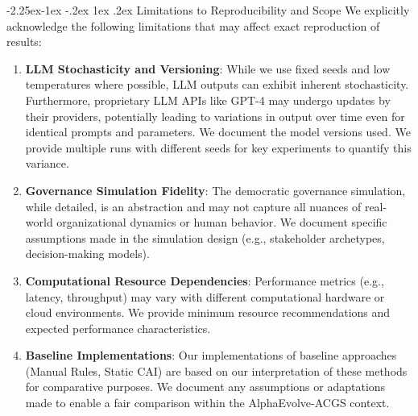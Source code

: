 \documentclass[manuscript,screen,review,anonymous,9pt]{acmart}
\makeatletter
\renewcommand\subsection{\@startsection{subsection}{2}{\z@}%
  {-2.25ex\@plus -1ex \@minus -.2ex}%
  {1ex \@plus .2ex}%
  {\normalfont\large\bfseries}}
\makeatother
\begin{document}
\subsection{Limitations to Reproducibility and Scope}
We explicitly acknowledge the following limitations that may affect exact reproduction of results:
\begin{enumerate}[leftmargin=*,itemsep=1pt,parsep=1pt]
    \item \textbf{LLM Stochasticity and Versioning}: While we use fixed seeds and low temperatures where possible, LLM outputs can exhibit inherent stochasticity. Furthermore, proprietary LLM APIs like GPT-4 may undergo updates by their providers, potentially leading to variations in output over time even for identical prompts and parameters. We document the model versions used. We provide multiple runs with different seeds for key experiments to quantify this variance.
    \item \textbf{Governance Simulation Fidelity}: The democratic governance simulation, while detailed, is an abstraction and may not capture all nuances of real-world organizational dynamics or human behavior. We document specific assumptions made in the simulation design (e.g., stakeholder archetypes, decision-making models).
    \item \textbf{Computational Resource Dependencies}: Performance metrics (e.g., latency, throughput) may vary with different computational hardware or cloud environments. We provide minimum resource recommendations and expected performance characteristics.
    \item \textbf{Baseline Implementations}: Our implementations of baseline approaches (Manual Rules, Static CAI) are based on our interpretation of these methods for comparative purposes. We document any assumptions or adaptations made to enable a fair comparison within the AlphaEvolve-ACGS context.
\end{enumerate}
\end{document}
